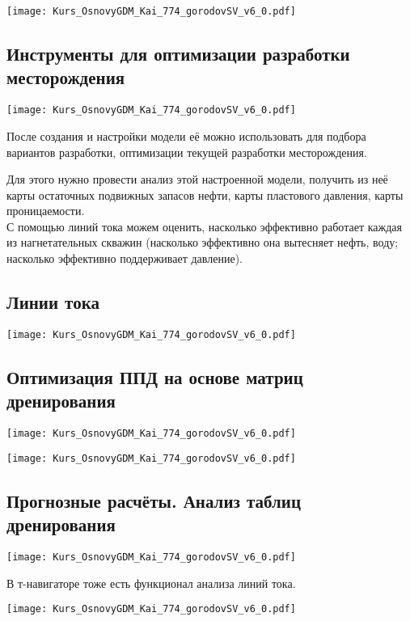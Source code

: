 \documentclass[main.tex]{subfiles}
\begin{document}
\texttt{[image: Kurs\_OsnovyGDM\_Kai\_774\_gorodovSV\_v6\_0.pdf]}

\subsection{Инструменты для оптимизации разработки месторождения}

\texttt{[image: Kurs\_OsnovyGDM\_Kai\_774\_gorodovSV\_v6\_0.pdf]}

После создания и настройки модели её можно использовать для подбора вариантов разработки, оптимизации текущей разработки месторождения.

Для этого нужно провести анализ этой настроенной модели, получить из неё карты остаточных подвижных запасов нефти, карты пластового давления, карты проницаемости.\\

С помощью линий тока можем оценить, насколько эффективно работает каждая из нагнетательных скважин (насколько эффективно она вытесняет нефть, воду; насколько эффективно поддерживает давление).

\subsection{Линии тока}

\texttt{[image: Kurs\_OsnovyGDM\_Kai\_774\_gorodovSV\_v6\_0.pdf]}

\subsection{Оптимизация ППД на основе матриц дренирования}

\texttt{[image: Kurs\_OsnovyGDM\_Kai\_774\_gorodovSV\_v6\_0.pdf]}

\texttt{[image: Kurs\_OsnovyGDM\_Kai\_774\_gorodovSV\_v6\_0.pdf]}

\subsection{Прогнозные расчёты. Анализ таблиц дренирования}

\texttt{[image: Kurs\_OsnovyGDM\_Kai\_774\_gorodovSV\_v6\_0.pdf]}

В т-навигаторе тоже есть функционал анализа линий тока.

\texttt{[image: Kurs\_OsnovyGDM\_Kai\_774\_gorodovSV\_v6\_0.pdf]}
\end{document}
